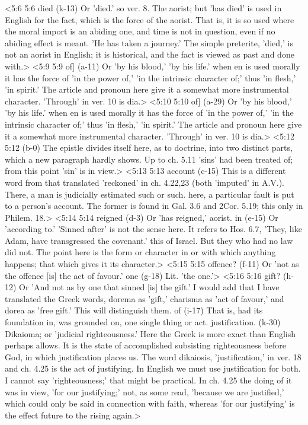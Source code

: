 <5:6 5:6  died (k-13)  Or 'died.' so ver. 8. The aorist; but 'has died' is used in  English for the fact, which is the force of the aorist. That  is, it is so used where the moral import is an abiding one, and  time is not in question, even if no abiding effect is meant.  'He has taken a journey.' The simple preterite, 'died,' is not  an aorist in English; it is historical, and the fact is viewed  as past and done with.>
<5:9 5:9  of] (a-11)  Or 'by his blood,' 'by his life.' when en is used morally  it has the force of 'in the power of,' 'in the intrinsic  character of;' thus 'in flesh,' 'in spirit.' The article and  pronoun here give it a somewhat more instrumental character.  'Through' in ver. 10 is dia.>
<5:10 5:10  of] (a-29)  Or 'by his blood,' 'by his life.' when en is used morally  it has the force of 'in the power of,' 'in the intrinsic  character of;' thus 'in flesh,' 'in spirit.' The article and  pronoun here give it a somewhat more instrumental character.  'Through' in ver. 10 is dia.>
<5:12 5:12   (b-0)  The epistle divides itself here, as to doctrine, into two  distinct parts, which a new paragraph hardly shows. Up to ch.  5.11 'sins' had been treated of; from this point 'sin' is in  view.>
<5:13 5:13  account (c-15)  This is a different word from that translated 'reckoned' in  ch. 4.22,23 (both 'imputed' in A.V.). There, a man is  judicially estimated such or such. here, a particular fault is  put to a person's account. The former is found in Gal. 3.6 and 2Cor. 5.19; this only in Philem. 18.>
<5:14 5:14  reigned (d-3)  Or 'has reigned,' aorist.
  in (e-15)  Or 'according to.' 'Sinned after' is not the sense here. It  refers to Hos. 6.7, 'They, like Adam, have transgressed the  covenant.' this of Israel. But they who had no law did not. The  point here is the form or character in or with which anything  happens; that which gives it its character.>
<5:15 5:15  offence? (f-11)  Or 'not as the offence [is] the act of favour.'
  one (g-18)  Lit. 'the one.'>
<5:16 5:16  gift? (h-12)  Or 'And not as by one that sinned [is] the gift.' I would add  that I have translated the Greek words, dorema as 'gift,'  charisma as 'act of favour,' and dorea as 'free gift.' This  will distinguish them.
  of (i-17)  That is, had its foundation in, was grounded on, one single  thing or act.
  justification. (k-30)  Dikaioma; or 'judicial righteousness.' Here the Greek is  more exact than English perhaps allows. It is the state of  accomplished subsisting righteousness before God, in which  justification places us. The word dikaiosis, 'justification,'  in ver. 18 and ch. 4.25 is the act of justifying. In English we  must use justification for both. I cannot say 'righteousness;'  that might be practical. In ch. 4.25 the doing of it was in  view, 'for our justifying;' not, as some read, 'because we are  justified,' which could only be said in connection with faith,  whereas 'for our justifying' is the effect future to the rising  again.>
